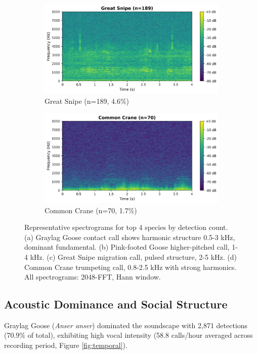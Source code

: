 \documentclass[twocolumn]{article}
\begin{document}
\begin{figure}[t]
\begin{subfigure}{0.48\textwidth}
\includegraphics[width=\textwidth]{figures/spectrogram_great_snipe.png}
\caption{Great Snipe (n=189, 4.6\%)}
\end{subfigure}
\hfill
\begin{subfigure}{0.48\textwidth}
\includegraphics[width=\textwidth]{figures/spectrogram_common_crane.png}
\caption{Common Crane (n=70, 1.7\%)}
\end{subfigure}
\caption{Representative spectrograms for top 4 species by detection count. (a) Graylag Goose contact call shows harmonic structure 0.5-3 kHz, dominant fundamental. (b) Pink-footed Goose higher-pitched call, 1-4 kHz. (c) Great Snipe migration call, pulsed structure, 2-5 kHz. (d) Common Crane trumpeting call, 0.8-2.5 kHz with strong harmonics. All spectrograms: 2048-FFT, Hann window.}
\label{fig:top_species_spectrograms}
\end{figure}

\subsection{Acoustic Dominance and Social Structure}

Graylag Goose (\textit{Anser anser}) dominated the soundscape with 2,871 detections (70.9\% of total), exhibiting high vocal intensity (58.8 calls/hour averaged across recording period, Figure \ref{fig:temporal}).
\end{document}
